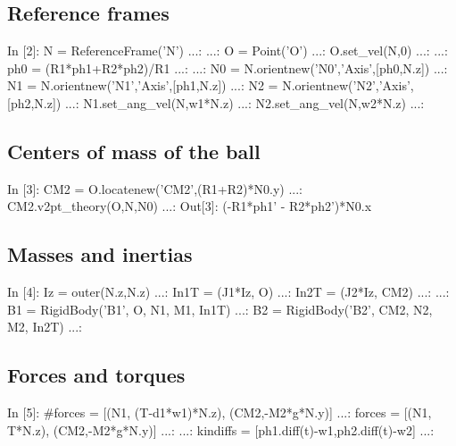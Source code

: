 \subsection{Reference frames}
\begin{code}
In [2]: N = ReferenceFrame('N')
   ...: 
   ...: O = Point('O')
   ...: O.set_vel(N,0)
   ...: 
   ...: ph0 = (R1*ph1+R2*ph2)/R1
   ...: 
   ...: N0 = N.orientnew('N0','Axis',[ph0,N.z])
   ...: N1 = N.orientnew('N1','Axis',[ph1,N.z])
   ...: N2 = N.orientnew('N2','Axis',[ph2,N.z])
   ...: N1.set_ang_vel(N,w1*N.z)
   ...: N2.set_ang_vel(N,w2*N.z)
   ...: 

\end{code}

\subsection{Centers of mass of the ball}
\begin{code}
In [3]: CM2 = O.locatenew('CM2',(R1+R2)*N0.y)
   ...: CM2.v2pt_theory(O,N,N0)
   ...: 
Out[3]: (-R1*ph1' - R2*ph2')*N0.x
\end{code}

\subsection{Masses and inertias}
\begin{code}
In [4]: Iz = outer(N.z,N.z)
   ...: In1T = (J1*Iz, O)
   ...: In2T = (J2*Iz, CM2)
   ...: 
   ...: B1 = RigidBody('B1', O, N1, M1, In1T)
   ...: B2 = RigidBody('B2', CM2, N2, M2, In2T)
   ...: 
\end{code}

\subsection{Forces and torques}
\begin{code}
In [5]: #forces = [(N1, (T-d1*w1)*N.z), (CM2,-M2*g*N.y)]
   ...: forces = [(N1, T*N.z), (CM2,-M2*g*N.y)]
   ...: 
   ...: kindiffs = [ph1.diff(t)-w1,ph2.diff(t)-w2]
   ...: 
\end{code}

